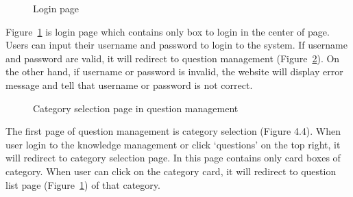 \documentclass[12pt,oneside,openright,a4paper]{cpe-english-project}
\begin{document}
	\begin{figure}[!h]\centering
		\caption{Login page}\label{fig:Login_page_done}
	\end{figure}
	\begin{flushleft}
		Figure~\ref*{fig:Login_page_done} is login page which contains only box to login in the center of page. Users can input their username and password to login to the system. If username and password are valid, it will redirect to question management (Figure~\ref*{fig:Category selection page in question management_done}). On the other hand, if username or password is invalid, the website will display error message and tell that username or password is not correct.
	\end{flushleft}
	\begin{figure}[!h]\centering
		\caption{Category selection page in question management}\label{fig:Category selection page in question management_done}
	\end{figure}
	\begin{flushleft}
		The first page of question management is category selection (Figure 4.4). When user login to the knowledge management or click ‘questions’ on the top right, it will redirect to category selection page. In this page contains only card boxes of category. When user can click on the category card, it will redirect to question list page (Figure~\ref*{fig:Login_page_done}) of that category.
	\end{flushleft}
\end{document}
